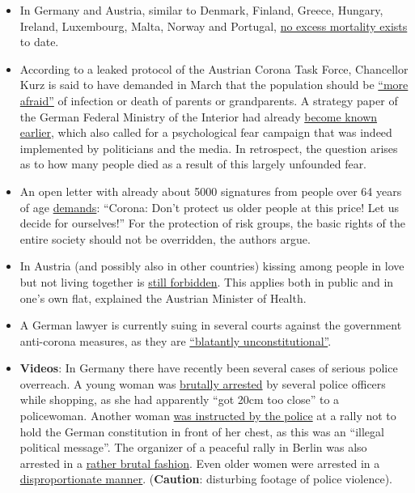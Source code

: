 \begin{itemize}
\tightlist
\item
  In Germany and Austria, similar to Denmark, Finland, Greece, Hungary,
  Ireland, Luxembourg, Malta, Norway and Portugal,
  \href{https://www.euromomo.eu/graphs-and-maps/}{no excess mortality
  exists} to date.
\item
  According to a leaked protocol of the Austrian Corona Task Force,
  Chancellor Kurz is said to have demanded in March that the population
  should be
  \href{https://www.derstandard.de/story/2000117131591/sitzungsprotokoll-der-taskforce-corona-ueber-zu-wenig-angst-in-der}{``more
  afraid''} of infection or death of parents or grandparents. A strategy
  paper of the German Federal Ministry of the Interior had already
  \href{https://fragdenstaat.de/dokumente/4123-wie-wir-covid-19-unter-kontrolle-bekommen/}{become
  known earlier}, which also called for a psychological fear campaign
  that was indeed implemented by politicians and the media. In
  retrospect, the question arises as to how many people died as a result
  of this largely unfounded fear.
\item
  An open letter with already about 5000 signatures from people over 64
  years of age
  \href{https://www.change.org/p/bundeskanzlerin-corona-sch\%C3\%BCtzen-sie-\%C3\%A4ltere-nicht-um-diesen-preis-selbstbestimmt-altern-und-sterben}{demands}:
  ``Corona: Don't protect us older people at this price! Let us decide
  for ourselves!'' For the protection of risk groups, the basic rights
  of the entire society should not be overridden, the authors argue.
\item
  In Austria (and possibly also in other countries) kissing among people
  in love but not living together is
  \href{https://www.unsertirol24.com/2020/04/29/oeffentliches-kuessen-wird-unter-strafe-gestellt/}{still
  forbidden}. This applies both in public and in one's own flat,
  explained the Austrian Minister of Health.
\item
  A German lawyer is currently suing in several courts against the
  government anti-corona measures, as they are
  \href{https://www.rubikon.news/artikel/eklatant-verfassungswidrig-2}{``blatantly
  unconstitutional''}.
\item
  \textbf{Videos}: In Germany there have recently been several cases of
  serious police overreach. A young woman was
  \href{https://web.archive.org/web/20200509235301/https://www.youtube.com/watch?v=TZrKv4-jkK8}{brutally
  arrested} by several police officers while shopping, as she had
  apparently ``got 20cm too close'' to a policewoman. Another woman
  \href{https://twitter.com/ChristianFritze/status/1256609660318224385}{was
  instructed by the police} at a rally not to hold the German
  constitution in front of her chest, as this was an ``illegal political
  message''. The organizer of a peaceful rally in Berlin was also
  arrested in a
  \href{https://web.archive.org/web/20200506155035/https://www.youtube.com/watch?v=NbV2OH3uYxI}{rather
  brutal fashion}. Even older women were arrested in a
  \href{https://www.youtube.com/watch?v=Bn11jXTjh_Y}{disproportionate
  manner}. (\textbf{Caution}: disturbing footage of police violence).
\end{itemize}

